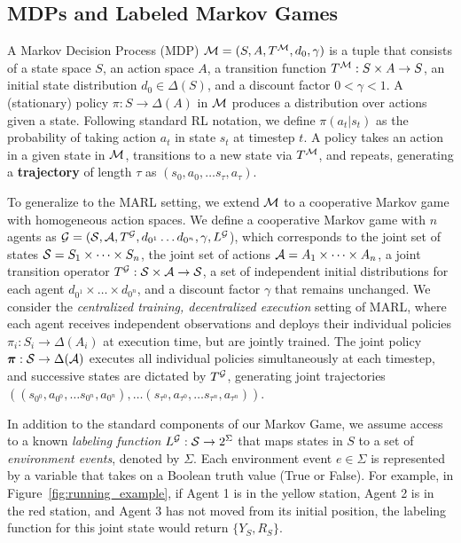 \subsection{MDPs and Labeled Markov Games}
A Markov Decision Process (MDP) $\mathcal{M} = (S, A, T^{\mathcal{M}}, d_0, \gamma)$ is a tuple that consists of a state space $S$, an action space $A$, a transition function $T^{\mathcal{M}}: S \times A \rightarrow S$, an initial state distribution $d_0 \in \Delta(S)$, and a discount factor $0 < \gamma < 1$. A (stationary) policy $\pi: S \rightarrow \Delta(A)$ in $\mathcal{M}$ produces a distribution over actions given a state. Following standard RL notation, we define $\pi(a_t | s_t)$ as the probability of taking action $a_t$ in state $s_t$ at timestep $t$. A policy takes an action in a given state in $\mathcal{M}$, transitions to a new state via $T^{\mathcal{M}}$, and repeats, generating a \textbf{trajectory} of length $\tau$ as $(s_0, a_0, \dots s_\tau, a_\tau)$. 

To generalize to the MARL setting, we extend $\mathcal{M}$ to a cooperative Markov game with homogeneous action spaces. We define a cooperative Markov game with $n$ agents as $\mathcal{G} = (\mathcal{S}, \mathcal{A}, T^{\mathcal{G}}, d_{0^1} \dots d_{0^n}, \gamma, L^{\mathcal{G}}$), which corresponds to the joint set of states $\mathcal{S} = S_1 \times \dots \times S_n$, the joint set of actions $\mathcal{A} = A_1 \times \dots \times A_n$, a joint transition operator $T^{\mathcal{G}}: \mathcal{S} \times \mathcal{A} \rightarrow \mathcal{S}$, a set of independent initial distributions for each agent $d_{0^1} \times \dots \times d_{0^n}$, and
a discount factor $\gamma$ that remains unchanged. We consider the \textit{centralized training, decentralized execution} \cite{bernstein2002complexity} setting of MARL, where each agent receives independent observations and deploys their individual policies $\pi_i: S_i \rightarrow \Delta(A_i)$ at execution time, but are jointly trained. The joint policy $\boldsymbol{\pi}: \mathcal{S} \rightarrow \Delta(\mathcal{A})$ executes all individual policies simultaneously at each timestep, and successive states are dictated by $T^{\mathcal{G}}$, generating joint trajectories $((s_{0^0}, a_{0^0},\dots s_{0^n}, a_{0^n}), \dots (s_{\tau^0}, a_{\tau^0},\dots s_{\tau^n}, a_{\tau^n}))$. 

In addition to the standard components of our Markov Game, we assume access to a known \textit{labeling function} $L^{\mathcal{G}}: \mathcal{S} \rightarrow 2^\Sigma$ that maps states in $S$ to a set of \textit{environment events}, denoted by $\Sigma$. Each environment event $e \in \Sigma$ is represented by a variable that takes on a Boolean truth value (True or False). For example, in Figure~\ref{fig:running_example}, if Agent 1 is in the yellow station, Agent 2 is in the red station, and Agent 3 has not moved from its initial position, the labeling function for this joint state would return $\{Y_S, R_S\}$. 



